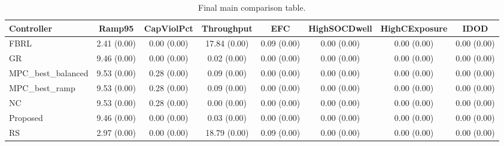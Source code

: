 \begin{table}[t]
\centering
\caption{Final main comparison table.}
\label{tab:results_final_auto}
\begin{tabular}{lccccccc}
\toprule
Controller & Ramp95 & CapViolPct & Throughput & EFC & HighSOCDwell & HighCExposure & IDOD \\
\midrule
FBRL & 2.41 (0.00) & 0.00 (0.00) & 17.84 (0.00) & 0.09 (0.00) & 0.00 (0.00) & 0.00 (0.00) & 0.00 (0.00) \\
GR & 9.46 (0.00) & 0.00 (0.00) & 0.02 (0.00) & 0.00 (0.00) & 0.00 (0.00) & 0.00 (0.00) & 0.00 (0.00) \\
MPC\_best\_balanced & 9.53 (0.00) & 0.28 (0.00) & 0.09 (0.00) & 0.00 (0.00) & 0.00 (0.00) & 0.00 (0.00) & 0.00 (0.00) \\
MPC\_best\_ramp & 9.53 (0.00) & 0.28 (0.00) & 0.09 (0.00) & 0.00 (0.00) & 0.00 (0.00) & 0.00 (0.00) & 0.00 (0.00) \\
NC & 9.53 (0.00) & 0.28 (0.00) & 0.00 (0.00) & 0.00 (0.00) & 0.00 (0.00) & 0.00 (0.00) & 0.00 (0.00) \\
Proposed & 9.46 (0.00) & 0.00 (0.00) & 0.03 (0.00) & 0.00 (0.00) & 0.00 (0.00) & 0.00 (0.00) & 0.00 (0.00) \\
RS & 2.97 (0.00) & 0.00 (0.00) & 18.79 (0.00) & 0.09 (0.00) & 0.00 (0.00) & 0.00 (0.00) & 0.00 (0.00) \\
\bottomrule
\end{tabular}
\end{table}